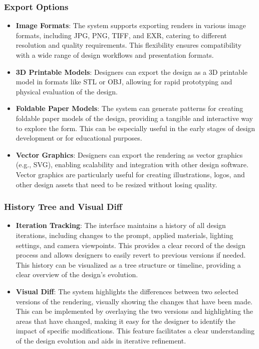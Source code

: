 \documentclass{article}
\begin{document}
\subsubsection{Export Options}
\begin{itemize}
\item \textbf{Image Formats}: The system supports exporting renders in various image formats, including JPG, PNG, TIFF, and EXR, catering to different resolution and quality requirements. This flexibility ensures compatibility with a wide range of design workflows and presentation formats.
\item \textbf{3D Printable Models}: Designers can export the design as a 3D printable model in formats like STL or OBJ, allowing for rapid prototyping and physical evaluation of the design.
\item \textbf{Foldable Paper Models}: The system can generate patterns for creating foldable paper models of the design, providing a tangible and interactive way to explore the form. This can be especially useful in the early stages of design development or for educational purposes.
\item \textbf{Vector Graphics}: Designers can export the rendering as vector graphics (e.g., SVG), enabling scalability and integration with other design software. Vector graphics are particularly useful for creating illustrations, logos, and other design assets that need to be resized without losing quality.
\end{itemize}

\subsubsection{History Tree and Visual Diff}
\begin{itemize}
\item \textbf{Iteration Tracking}: The interface maintains a history of all design iterations, including changes to the prompt, applied materials, lighting settings, and camera viewpoints. This provides a clear record of the design process and allows designers to easily revert to previous versions if needed. This history can be visualized as a tree structure or timeline, providing a clear overview of the design's evolution.
\item \textbf{Visual Diff}: The system highlights the differences between two selected versions of the rendering, visually showing the changes that have been made. This can be implemented by overlaying the two versions and highlighting the areas that have changed, making it easy for the designer to identify the impact of specific modifications. This feature facilitates a clear understanding of the design evolution and aids in iterative refinement.
\end{itemize}
\end{document}
